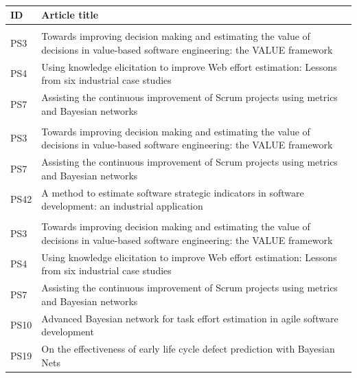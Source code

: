 \begin{table}[t]
\caption{}
\label{tab:bons_exemplos}
\centering
\small
\renewcommand{\arraystretch}{1.15}
\setlength{\tabcolsep}{8pt}

\begin{tabularx}{\textwidth}{>{\raggedright\arraybackslash}p{45pt}
                                >{\raggedright\arraybackslash}X}
\toprule
\textbf{ID} & \textbf{Article title} \\
\midrule

\multicolumn{2}{l}{\textbf{Structure building}} \\[2pt]
PS3 & Towards improving decision making and estimating the value of decisions in value-based software engineering: the VALUE framework \\
PS4 & Using knowledge elicitation to improve Web effort estimation: Lessons from six industrial case studies \\
PS7 & Assisting the continuous improvement of Scrum projects using metrics and Bayesian networks \\

\addlinespace[6pt]
\multicolumn{2}{l}{\textbf{Parameter estimation}} \\[2pt]
PS3 & Towards improving decision making and estimating the value of decisions in value-based software engineering: the VALUE framework \\
PS7 & Assisting the continuous improvement of Scrum projects using metrics and Bayesian networks \\
PS42 & A method to estimate software strategic indicators in software development: an industrial application \\

\addlinespace[6pt]
\multicolumn{2}{l}{\textbf{Model validation}} \\[2pt]
PS3 & Towards improving decision making and estimating the value of decisions in value-based software engineering: the VALUE framework \\
PS4 & Using knowledge elicitation to improve Web effort estimation: Lessons from six industrial case studies \\
PS7 & Assisting the continuous improvement of Scrum projects using metrics and Bayesian networks \\
PS10 & Advanced Bayesian network for task effort estimation in agile software development \\
PS19 & On the effectiveness of early life cycle defect prediction with Bayesian Nets \\

\bottomrule
\end{tabularx}
\end{table}
\FloatBarrier

